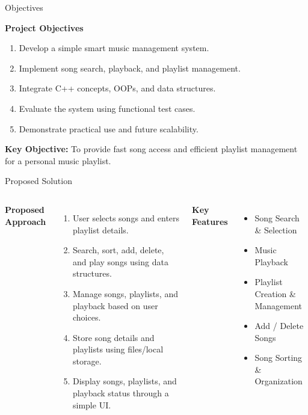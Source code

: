 \documentclass[aspectratio=169,11pt]{beamer}
\begin{document}
\begin{frame}{Objectives}

\textbf{\color{GEUBlue}Project Objectives}
\vspace{2mm}

\begin{enumerate}\itemsep5pt
\item Develop a simple smart music management system.
\item Implement song search, playback, and playlist management.
\item Integrate C++ concepts, OOPs, and data structures.
\item Evaluate the system using functional test cases.
\item Demonstrate practical use and future scalability.
\end{enumerate}

\vfill

\begin{center}
\colorbox{GEULightBlue}{%
\parbox{.80\textwidth}{\centering
\textbf{Key Objective:}
To provide fast song access and efficient playlist management
for a personal music playlist.}}
\end{center}

\end{frame}

\begin{frame}{Proposed Solution}

\begin{columns}[T,totalwidth=\textwidth]

\textbf{\color{GEUBlue}Proposed Approach}
\begin{enumerate}\itemsep3pt
\item User selects songs and enters playlist details.
\item Search, sort, add, delete, and play songs using data structures.
\item Manage songs, playlists, and playback based on user choices.
\item Store song details and playlists using files/local storage.
\item Display songs, playlists, and playback status through a simple UI.
\end{enumerate}

\textbf{\color{GEUBlue}Key Features}
\begin{itemize}\itemsep4pt
\item Song Search \& Selection
\item Music Playback
\item Playlist Creation \& Management
\item Add / Delete Songs
\item Song Sorting \& Organization
\end{itemize}

\end{columns}
\end{frame}
\end{document}
